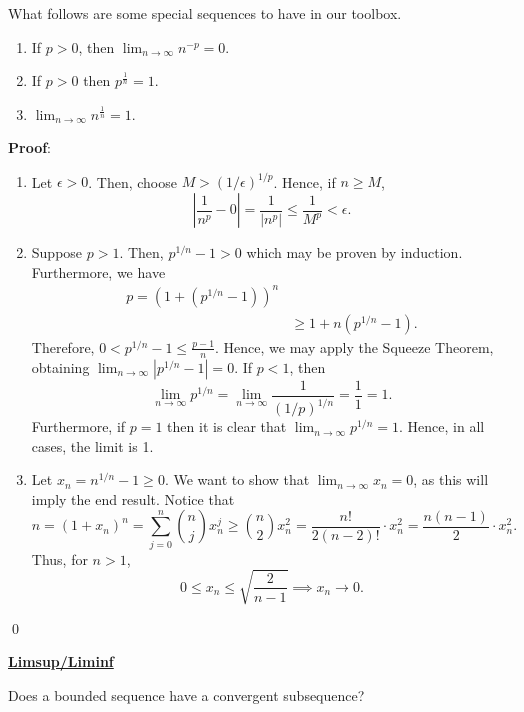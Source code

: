 

\begin{theorem}
What follows are some special sequences to have in our toolbox. 
\begin{enumerate}
    \item If $p>0$, then $\lim_{n\to \infty} n^{-p} = 0$.
    \item If $p>0$ then $p^{\frac{1}{n}} = 1$. 
    \item $\lim_{n\to \infty} n^{\frac{1}{n}} = 1$.
\end{enumerate}
\end{theorem}
\textbf{Proof}:
\begin{enumerate}
    \item Let $\epsilon>0$. Then, choose $M > (1/\epsilon)^{1/p}$. Hence, if $n\geq M$,
    \[
    \left|\frac{1}{n^p} - 0\right| = \frac{1}{|n^p|} \leq \frac{1}{M^p} < \epsilon. 
    \]
    \item Suppose $p>1$. Then, $p^{1/n} -1 >0$ which may be proven by induction. Furthermore, we have 
    \begin{align*}
        p = (1+(p^{1/n} -1))^n \\
        &\geq 1 + n(p^{1/n}-1).
    \end{align*}
    Therefore, $0 < p^{1/n}-1 \leq \frac{p-1}{n}$. Hence, we may apply the Squeeze Theorem, obtaining $\lim_{n\to \infty} |p^{1/n}-1| = 0$. If $p< 1$, then
    \[
    \lim_{n\to \infty} p^{1/n} = \lim_{n\to \infty} \frac{1}{(1/p)^{1/n}} = \frac{1}{1} =1.
    \]
    Furthermore, if $p =1$ then it is clear that $\lim_{n\to \infty} p^{1/n} = 1$. Hence, in all cases, the limit is 1.
    \item Let $x_n = n^{1/n}-1 \geq 0$. We want to show that $\lim_{n\to \infty} x_n = 0$, as this will imply the end result. Notice that 
    \[
        n = (1+x_n)^n = \sum_{j=0}^n {n\choose j} x_n^j \geq {n\choose 2} x_n^2 = \frac{n!}{2(n-2)!} \cdot x_n^2 = \frac{n(n-1)}{2} \cdot x_n^2.
    \]
    Thus, for $n>1$,
    \[
    0 \leq x_n \leq \sqrt{\frac{2}{n-1}} \implies x_n \to 0.
    \]
\end{enumerate} \qed 

\noindent\underline{\textbf{Limsup/Liminf}}
\begin{question}
Does a bounded sequence have a convergent subsequence?
\end{question}

